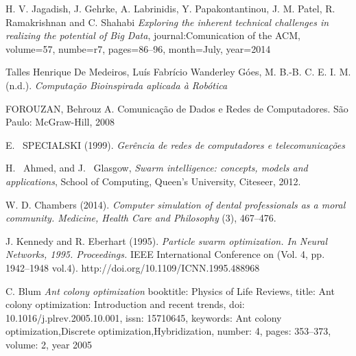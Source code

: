 \documentclass[conference,compsoc]{IEEEtran}
\begin{document}
%
%
%
\begin{thebibliography}{1}


  H. V. Jagadish, J. Gehrke, A. Labrinidis, Y. Papakontantinou, J. M. Patel, R. Ramakrishnan and C. Shahabi
  \emph{Exploring the inherent technical challenges in realizing the potential of Big Data},
  journal:Comunication of the ACM, volume=57, numbe=r7, pages=86--96, month=July, year=2014

  
Talles Henrique De Medeiros, Luís Fabrício Wanderley Góes, M. B.-B. C. E. I. M. (n.d.). 
\emph{Computação Bioinspirada aplicada à Robótica}

FOROUZAN, Behrouz A. Comunicação de Dados e Redes de Computadores. São Paulo: McGraw-Hill, 2008

E. ~SPECIALSKI (1999).
\emph{Gerência de redes de computadores e telecomunicações}

H. ~Ahmed, and J. ~Glasgow,
\emph{Swarm intelligence: concepts, models and applications},
\relax School of Computing, Queen's University, Citeseer, 2012.

W. D. Chambers (2014).
\emph{Computer simulation of dental professionals as a moral community. Medicine, Health Care and Philosophy}
(3), 467–476.

J. Kennedy and R. Eberhart (1995). 
\emph{Particle swarm optimization. In Neural Networks, 1995. Proceedings.}
IEEE International Conference on (Vol. 4, pp. 1942–1948 vol.4). http://doi.org/10.1109/ICNN.1995.488968


C. Blum
\emph{Ant colony optimization}
booktitle: {Physics of Life Reviews},
title: {{Ant colony optimization: Introduction and recent trends}},
doi: {10.1016/j.plrev.2005.10.001},
issn: {15710645},
keywords: {Ant colony optimization,Discrete optimization,Hybridization},
number: {4},
pages: {353--373},
volume: {2},
year {2005}


\end{thebibliography}
\end{document}
